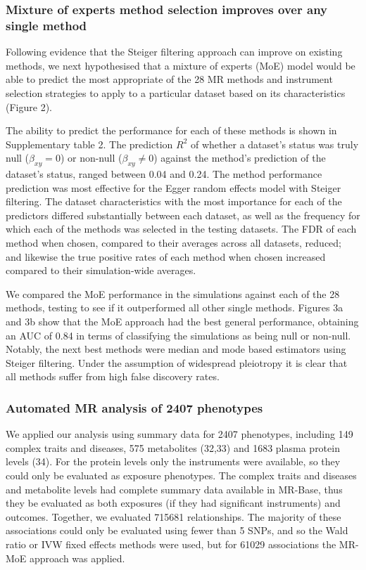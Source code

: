 \documentclass[]{article}
\begin{document}
\subsubsection{Mixture of experts method selection improves over any
single
method}\label{mixture-of-experts-method-selection-improves-over-any-single-method}

Following evidence that the Steiger filtering approach can improve on
existing methods, we next hypothesised that a mixture of experts (MoE)
model would be able to predict the most appropriate of the 28 MR methods
and instrument selection strategies to apply to a particular dataset
based on its characteristics (Figure 2).

The ability to predict the performance for each of these methods is
shown in Supplementary table 2. The prediction \(R^2\) of whether a
dataset's status was truly null (\(\beta_{xy}=0\)) or non-null
(\(\beta_{xy} \neq 0\)) against the method's prediction of the dataset's
status, ranged between 0.04 and 0.24. The method performance prediction
was most effective for the Egger random effects model with Steiger
filtering. The dataset characteristics with the most importance for each
of the predictors differed substantially between each dataset, as well
as the frequency for which each of the methods was selected in the
testing datasets. The FDR of each method when chosen, compared to their
averages across all datasets, reduced; and likewise the true positive
rates of each method when chosen increased compared to their
simulation-wide averages.

We compared the MoE performance in the simulations against each of the
28 methods, testing to see if it outperformed all other single methods.
Figures 3a and 3b show that the MoE approach had the best general
performance, obtaining an AUC of 0.84 in terms of classifying the
simulations as being null or non-null. Notably, the next best methods
were median and mode based estimators using Steiger filtering. Under the
assumption of widespread pleiotropy it is clear that all methods suffer
from high false discovery rates.

\subsubsection{Automated MR analysis of 2407
phenotypes}\label{automated-mr-analysis-of-2407-phenotypes}

We applied our analysis using summary data for 2407 phenotypes,
including 149 complex traits and diseases, 575 metabolites (32,33) and
1683 plasma protein levels (34). For the protein levels only the
instruments were available, so they could only be evaluated as exposure
phenotypes. The complex traits and diseases and metabolite levels had
complete summary data available in MR-Base, thus they be evaluated as
both exposures (if they had significant instruments) and outcomes.
Together, we evaluated 715681 relationships. The majority of these
associations could only be evaluated using fewer than 5 SNPs, and so the
Wald ratio or IVW fixed effects methods were used, but for 61029
associations the MR-MoE approach was applied.
\end{document}
